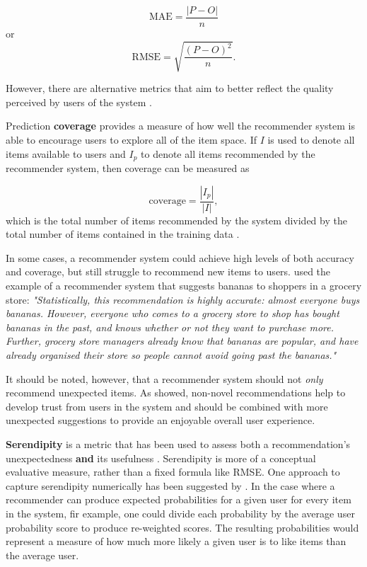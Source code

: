 \begin{equation}
    \text{MAE} = \dfrac{|P - O|}{n}
\end{equation}
or
\begin{equation}
    \text{RMSE} = \sqrt{\dfrac{(P - O)^{2}}{n}}.
\end{equation}

However, there are alternative metrics that aim to better reflect the quality perceived by users of the system \parencite{eval_colab}.

Prediction \textbf{coverage} provides a measure of how well the recommender system is able to encourage users to explore all of the item space. If $I$ is used to denote all items available to users and $I_p$ to denote all items recommended by the recommender system, then coverage can be measured as

\begin{equation} \label{eqn:cov}
    \text{coverage} = \dfrac{|I_p|}{|I|},
\end{equation}
which is the total number of items recommended by the system divided by the total number of items contained in the training data \parencite{eval_coverage}.

In some cases, a recommender system could achieve high levels of both accuracy and coverage, but still struggle to recommend new items to users. \cite{eval_colab} used the example of a recommender system that suggests bananas to shoppers in a grocery store: \textit{"Statistically, this recommendation is highly accurate: almost everyone buys bananas. However, everyone who comes to a grocery store to shop has bought bananas in the past, and knows whether or not they want to purchase more. Further, grocery store managers already know that bananas are popular, and have already organised their store so people cannot avoid going past the bananas."} 

It should be noted, however, that a recommender system should not \textit{only} recommend unexpected items. As \cite{swearingen2001beyondalgorithms} showed, non-novel recommendations help to develop trust from users in the system and should be combined with more unexpected suggestions to provide an enjoyable overall user experience.

\textbf{Serendipity} is a metric that has been used to assess both a recommendation's unexpectedness \textbf{and} its usefulness \parencite{online_predicting}. Serendipity is more of a conceptual evaluative measure, rather than a fixed formula like RMSE. One approach to capture serendipity numerically has been suggested by \parencite{eval_colab}. In the case where a recommender can produce expected probabilities for a given user for every item in the system, fir example, one could divide each probability by the average user probability score to produce re-weighted scores. The resulting probabilities would represent a measure of how much more likely a given user is to like items than the average user.

